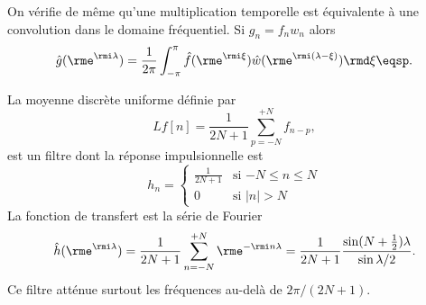 On v\'erifie de m\^eme qu'une multiplication temporelle est
\'equivalente \`a une convolution dans le domaine fr\'equentiel.
Si $g_n = f_n w_n$ alors
\[
\hat{g}({\rme^{\rmi \lambda}}) = \frac 1 {2 \pi} \int_{-\pi}^{\pi}
\hat f(\rme^{\rmi \xi }) \hat{w} (\rme^{\rmi(\lambda -\xi)}) \rmd \xi \eqsp.
\]
\begin{example}
La moyenne discr\`ete uniforme d\'efinie par
\[
Lf[n] = \frac 1 {2N+1} \sum_{p=-N}^{+N} f_{n-p} ,
\]
est un filtre dont la r\'eponse impulsionnelle est
\begin{equation}
h_n =
   \left \{ \begin{array}{ll}
            \frac 1 {2N+1}& \mbox{si $-N \leq  n \leq N$}\\
            0 & \mbox{si $|n| > N$}
            \end{array}
   \right.
\end{equation}
La fonction de transfert est la s\'erie de Fourier
\[
\hat h({\rme^{\rmi \lambda}}) = \frac 1 {2N+1}
\sum_{n=-N}^{+N} \rme^{-\rmi n\lambda} = \frac 1 {2N+1}
\frac {\sin (N+\half)\lambda} {\sin\lambda/2} .
\]
Ce filtre att\'enue surtout les fr\'equences
au-del\`a de $ {2\pi}/ (2N+1)$.
\end{example}
